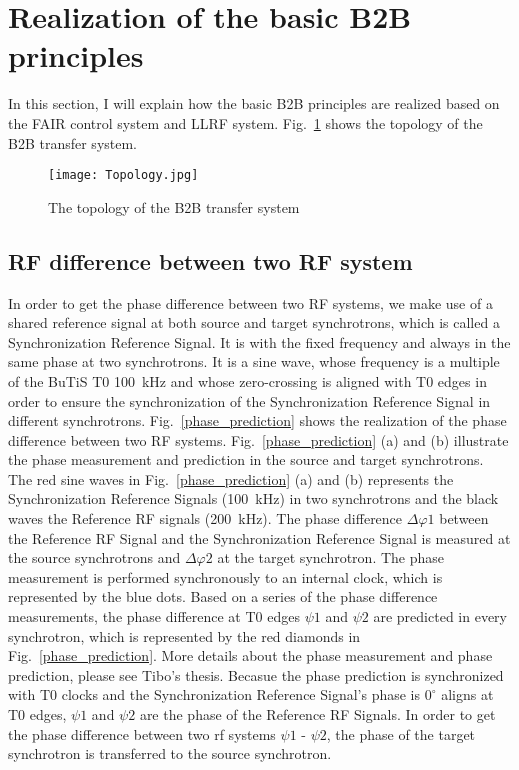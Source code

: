 \section{Realization of the basic B2B principles}
In this section, I will explain how the basic B2B principles are realized based on the FAIR control system and LLRF system.
Fig.~\ref{Topology} shows the topology of the B2B transfer system.
\begin{figure}[!htb]
   \centering   
   \texttt{[image: Topology.jpg]}
   \caption{The topology of the B2B transfer system}
   \label{Topology}
\end{figure}
\subsection{RF difference between two RF system}
In order to get the phase difference between two RF systems, we make use of a shared reference signal at both source and target synchrotrons, which is called a Synchronization Reference Signal. It is with the fixed frequency and always in the same phase at two synchrotrons. It is a sine wave, whose frequency is a multiple of the BuTiS T0 \SI{100}{kHz} and whose zero-crossing is aligned with T0 edges in order to ensure the synchronization of the Synchronization Reference Signal in different synchrotrons. Fig.~\ref{phase_prediction} shows the realization of the phase difference between two RF systems. Fig.~\ref{phase_prediction} (a) and (b) illustrate the phase measurement and prediction in the source and target synchrotrons. The red sine waves in Fig.~\ref{phase_prediction} (a) and (b) represents the Synchronization Reference Signals (\SI{100}{kHz}) in two synchrotrons and the black waves the Reference RF signals (\SI{200}{kHz}). The phase difference $\Delta \varphi1$ between the Reference RF Signal and the Synchronization Reference Signal is measured at the source synchrotrons and $\Delta \varphi2$ at the target synchrotron. The phase measurement is performed synchronously to an internal clock, which is represented by the blue dots. Based on a series of the phase difference measurements, the phase difference at T0 edges $\psi1$ and $\psi2$ are predicted in every synchrotron, which is represented by the red diamonds in Fig.~\ref{phase_prediction}. More details about the phase measurement and phase prediction, please see Tibo's thesis. Becasue the phase prediction is synchronized with T0 clocks and the Synchronization Reference Signal's phase is $0^\circ$ aligns at T0 edges, $\psi1$ and $\psi2$ are the phase of the Reference RF Signals. In order to get the phase difference between two rf systems $\psi1$ - $\psi2$, the phase of the target synchrotron is transferred to the source synchrotron. 

